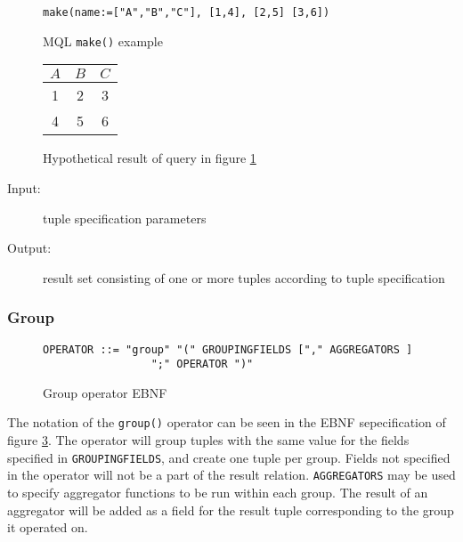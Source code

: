 \begin{figure}[!h]
\centering
\begin{Verbatim}
make(name:=["A","B","C"], [1,4], [2,5] [3,6])
\end{Verbatim}
\caption{MQL \texttt{make()} example}
\label{figure:mql:make_example2}
\end{figure}

\begin{figure}[!h]
\centering
\begin{tabular}{|c | c | c |}
\hline
$A$ & $B$ & $C$ \\ \hline
1 & 2 & 3 \\ \hline
4 & 5 & 6 \\ \hline
\end{tabular}
\caption{Hypothetical result of query in figure
\ref{figure:mql:make_example2}}
\label{figure:mql:make_example2_result}
\end{figure}

\begin{description}
  \item[Input:] tuple specification parameters
  \item[Output:] result set consisting of one or more tuples according to tuple
  specification
\end{description}

\subsubsection{Group}

\begin{figure}[h]
\begin{Verbatim}
OPERATOR ::= "group" "(" GROUPINGFIELDS ["," AGGREGATORS ] 
                 ";" OPERATOR ")"
\end{Verbatim}
\label{figure:mql:groupEBNF}
\caption{Group operator EBNF}
\end{figure}

The notation of the \texttt{group()} operator can be seen in the EBNF sepecification of figure
\ref{figure:mql:groupEBNF}. The operator will group tuples with the same value for the fields specified in
\texttt{GROUPINGFIELDS}, and create one tuple per group. Fields not specified in the operator will not be a part
of the result relation. \texttt{AGGREGATORS} may be used to specify aggregator functions to be run within each
group. The result of an aggregator will be added as a field for the result tuple corresponding to the group it
operated on.


